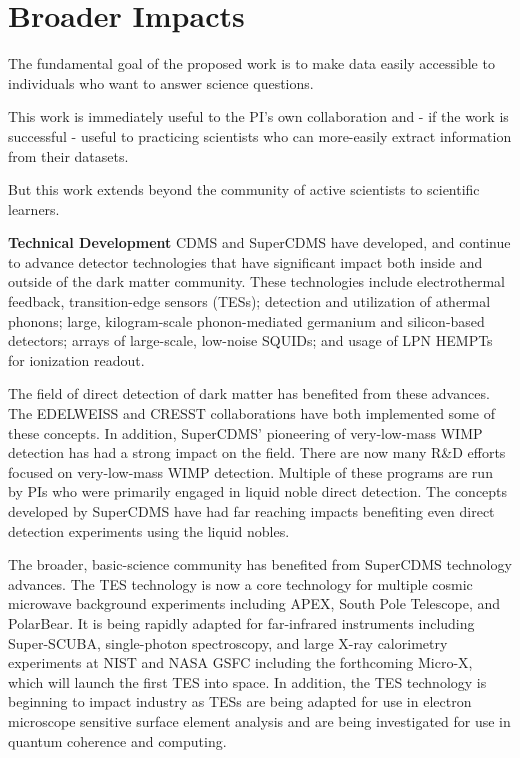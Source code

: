 \section{Broader Impacts}
\label{sec:broad}

The fundamental goal of the proposed work is to make data easily accessible to individuals who want to answer science questions.

This work is immediately useful to the PI's own collaboration and - if the work is successful - useful to practicing scientists who can more-easily extract information from their datasets.

But this work extends beyond the community of active scientists to scientific learners.



\textbf{Technical Development}
CDMS and SuperCDMS have developed, and continue to advance detector technologies that have significant impact both inside and outside of the dark matter community. These technologies include electrothermal feedback, transition-edge sensors (TESs); detection and utilization of athermal phonons; large, kilogram-scale phonon-mediated germanium and silicon-based detectors; arrays of large-scale, low-noise SQUIDs; and usage of LPN HEMPTs for ionization readout.

The field of direct detection of dark matter has benefited from these advances. The EDELWEISS and CRESST collaborations have both implemented some of these concepts. In addition, SuperCDMS’ pioneering of very-low-mass WIMP detection has had a strong impact on the field. There are now many R\&D efforts focused on very-low-mass WIMP detection. Multiple of these programs are run by PIs who were primarily engaged in liquid noble direct detection. The concepts developed by SuperCDMS have had far reaching impacts benefiting even direct detection experiments using the liquid nobles. 

The broader, basic-science community has benefited from SuperCDMS technology advances. The TES technology is now a core technology for multiple cosmic microwave background experiments including APEX, South Pole Telescope, and PolarBear. It is being rapidly adapted for far-infrared instruments including Super-SCUBA, single-photon spectroscopy, and large X-ray calorimetry experiments at NIST and NASA GSFC including the forthcoming Micro-X, which will launch the first TES into space. In addition, the TES technology is beginning to impact industry as TESs are being adapted for use in electron microscope sensitive surface element analysis and are being investigated for use in quantum coherence and computing.

